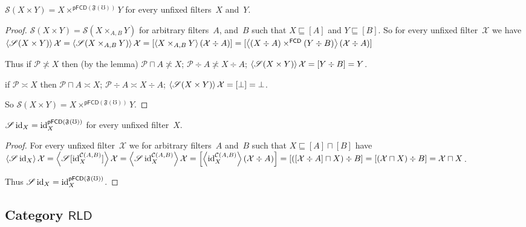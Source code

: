 
\begin{prop}\label{pfunf-prod}
$\mathscr{S}(X\times Y)
=X\times^{\mathsf{pFCD}(\mathfrak{F}(\mho))}Y$
for every unfixed filters~$X$ and~$Y$.
\end{prop}

\begin{proof}
$\mathscr{S}(X\times Y) = \mathscr{S}(X\times_{A,B}Y)$
for arbitrary filters~$A$, and~$B$ such that
$X\sqsubseteq[A]$ and $Y\sqsubseteq[B]$. So
for every unfixed filter~$\mathcal{X}$ we have
$\left\langle \mathscr{S}(X\times Y)\right\rangle\mathcal{X}=
\left\langle \mathscr{S}(X\times_{A,B}Y)\right\rangle\mathcal{X}=
[\left\langle X\times_{A,B}Y\right\rangle(\mathcal{X}\div A)]=
[\left\langle (X\div A)\times^{\mathsf{FCD}}(Y\div B)\right\rangle
(\mathcal{X}\div A)]$

Thus if $\mathcal{P}\nasymp X$ then
(by the lemma)
$\mathcal{P}\sqcap A\nasymp X$;
$\mathcal{P}\div A\nasymp X\div A$;
$\left\langle \mathscr{S}(X\times Y)\right\rangle\mathcal{X}=
[Y\div B]=Y$.

if $\mathcal{P}\asymp X$ then
$\mathcal{P}\sqcap A\asymp X$;
$\mathcal{P}\div A\asymp X\div A$;
$\left\langle \mathscr{S}(X\times Y)\right\rangle\mathcal{X}=
[\bot]=\bot$.

So $\mathscr{S}(X\times Y)
=X\times^{\mathsf{pFCD}(\mathfrak{F}(\mho))}Y$.
\end{proof}

\begin{prop}\label{pfunf-id}
$\mathscr{S}\operatorname{id}_X=
\operatorname{id}^{\mathsf{pFCD}(\mathfrak{F}(\mho))}_{X}$
for every unfixed filter~$X$.
\end{prop}

\begin{proof}
For every unfixed filter~$\mathcal{X}$ we
for arbitrary filters~$A$ and~$B$ such that
$X\sqsubseteq[A]\sqcap[B]$
have
$\left\langle \mathscr{S}\operatorname{id}_X\right\rangle\mathcal{X}=
\left\langle \mathscr{S}[\operatorname{id}^{\mathcal{C}(A,B)}_X]\right\rangle\mathcal{X}=
\left\langle \mathscr{S}\operatorname{id}^{\mathcal{C}(A,B)}_X\right\rangle
\mathcal{X}=
\left[\left\langle \operatorname{id}^{\mathcal{C}(A,B)}_X\right\rangle
(\mathcal{X}\div A)\right]=
[([\mathcal{X}\div A]\sqcap X)\div B]=
[(\mathcal{X}\sqcap X)\div B]=
\mathcal{X}\sqcap X$.

Thus $\mathscr{S}\operatorname{id}_X=
\operatorname{id}^{\mathsf{pFCD}(\mathfrak{F}(\mho))}_{X}$.
\end{proof}

\subsection{\texorpdfstring{Category $\mathsf{RLD}$}{Category RLD}}

